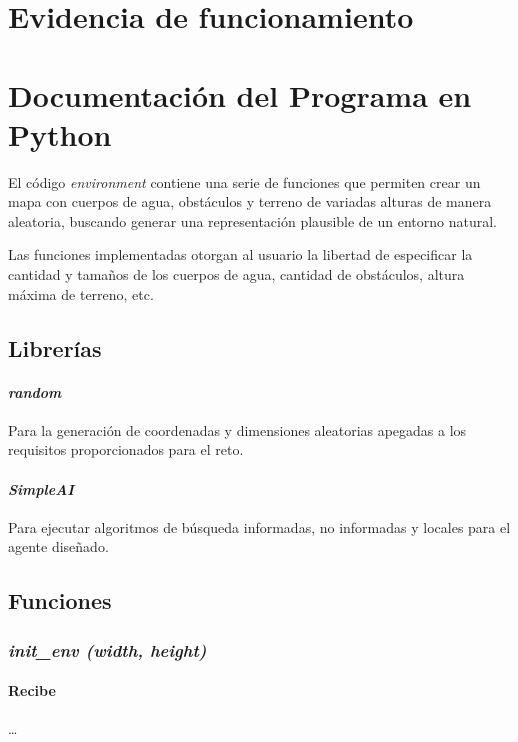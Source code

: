 \documentclass[12pt, letterpaper]{article}
\begin{document}
\section{Evidencia de funcionamiento}

\section{Documentación del Programa en Python}

El código \textit{environment} contiene una serie de funciones que permiten crear un mapa con cuerpos de agua, obstáculos y terreno de variadas alturas de manera aleatoria, buscando generar una representación plausible de un entorno natural.

Las funciones implementadas otorgan al usuario la libertad de especificar la cantidad y tamaños de los cuerpos de agua, cantidad de obstáculos, altura máxima de terreno, etc.

    \subsection{Librerías}
        \paragraph{\textit{random}}\cite{abdugafforovna2023modules} Para la generación de coordenadas y dimensiones aleatorias apegadas a los requisitos proporcionados para el reto.

        \paragraph{\textit{SimpleAI}}\cite{thaker2020python} Para ejecutar algoritmos de búsqueda informadas, no informadas y locales para el agente diseñado.

    \subsection{Funciones}

        \subsubsection{\textit{init\_env (width, height)}}

            \paragraph{Recibe}
            \dots
\end{document}
